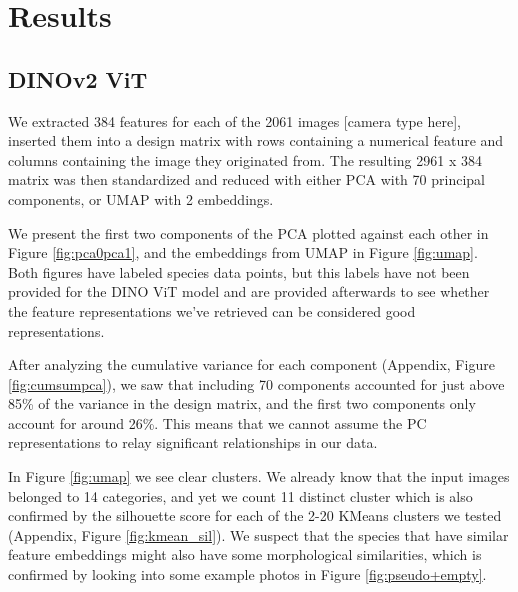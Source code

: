 \section{Results}\label{sec:results}

%
%
\subsection{DINOv2 ViT}
We extracted 384 features for each of the 2061 images [camera type here], inserted them into a design matrix with rows containing a numerical feature and columns containing the image they originated from. The resulting 2961 x 384 matrix was then standardized and reduced with either PCA with 70 principal components, or UMAP with 2 embeddings. 

We present the first two components of the PCA plotted against each other in Figure \ref{fig:pca0pca1}, and the embeddings from UMAP in Figure \ref{fig:umap}. Both figures have labeled species data points, but this labels have not been provided for the DINO ViT model and are provided afterwards to see whether the feature representations we've retrieved can be considered good representations.

After analyzing the cumulative variance for each component (Appendix, Figure \ref{fig:cumsumpca}), we saw that including 70 components accounted for just above 85\% of the variance in the design matrix, and the first two components only account for around 26\%. This means that we cannot assume the PC representations to relay significant relationships in our data. 

In Figure \ref{fig:umap} we see clear clusters. We already know that the input images belonged to 14 categories, and yet we count 11 distinct cluster which is also confirmed by the silhouette score for each of the 2-20 KMeans clusters we tested (Appendix, Figure \ref{fig:kmean_sil}). We suspect that the species that have similar feature embeddings might also have some morphological similarities, which is confirmed by looking into some example photos in Figure \ref{fig:pseudo+empty}. 

